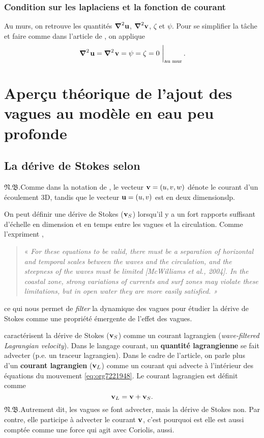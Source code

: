 \documentclass[10pt]{report}
\numberwithin{equation}{section}
\newcommand{\uu}{\vb{u}}
\newcommand{\vv}{\vb{v}}
\newcommand{\pt}{\hspace{1pt}} %
\newcommand{\nb}{\underline{{\footnotesize\EightStarConvex}\pt $\mathfrak{N.B.}$\vphantom{p}}\hspace{3pt}}
\begin{document}
\subsection{Condition sur les laplaciens et la fonction de courant}
\label{sec:org85ab65d}
Au murs, on retrouve les quantités \(\gradient^2{\uu}\), \(\gradient^2{\vv}\), \(\zeta\) et \(\psi\).
Pour se simplifier la tâche et faire comme dans l'article de \autocite{duhaut2006}, on applique
\begin{equation}
   \eval{\gradient^2\pt\uu = \gradient^2\pt\vv = \psi = \zeta =  0\ }_\text{au mur}.
\end{equation}


\chapter{Aperçu théorique de l'ajout des vagues au modèle en eau peu profonde}
\label{sec:org962c594}

\section{La dérive de Stokes selon }
\label{sec:org3b40207}

\nb Comme dans la notation de \textcite{vallis_2006}, le vecteur \(\vv = \qty(u,v,w)\) dénote le courant d'un écoulement 3D, tandis que le vecteur \(\uu = (u,v)\) est en deux dimensionslp.\bigskip

On peut définir une dérive de Stokes (\(\vv_S\)) lorsqu'il y a un fort rapports suffisant d'échelle en dimension et en temps entre les vagues et la circulation.
Comme l'expriment \textcite[voir][pour un résumé]{suzuki2016understanding},\smallskip
\begin{quote}
« \emph{For these equations to be valid, there must be a separation of horizontal and temporal scales between the waves and the circulation, and the steepness of the waves must be limited [McWilliams et al., 2004].
In the coastal zone, strong variations of currents and surf zones may violate these limitations, but in open water they are more easily satisﬁed. »}\bigskip
\end{quote}
ce qui nous permet de \emph{filter} la dynamique des vagues pour étudier la dérive de Stokes comme une propriété émergente de l'effet des vagues. \bigskip

\textcite{suzuki2016understanding}  caractérisent la dérive de Stokes (\(\vv_S\)) comme un courant lagrangien (\emph{wave-ﬁltered Lagrangian velocity}).
Dans le langage courant, un \textbf{quantité lagrangienne} se fait advecter (p.e. un traceur lagrangien).
Dans le cadre de l'article, on parle plus d'un \textbf{courant lagrangien} (\(\vv_L\)) comme un courant qui advecte à l'intérieur des équations du mouvement \ref{eq:org7221948}.
Le courant lagrangien est définit comme
\begin{equation}
   \vv_L = \vv + \vv_S.
\end{equation}
\nb Autrement dit, les vagues se font advecter, mais la dérive de Stokes non.
Par contre, elle participe à advecter le courant \(\vv\), c'est pourquoi est elle est aussi comptée comme une force qui agit avec Coriolis, aussi.
\end{document}

